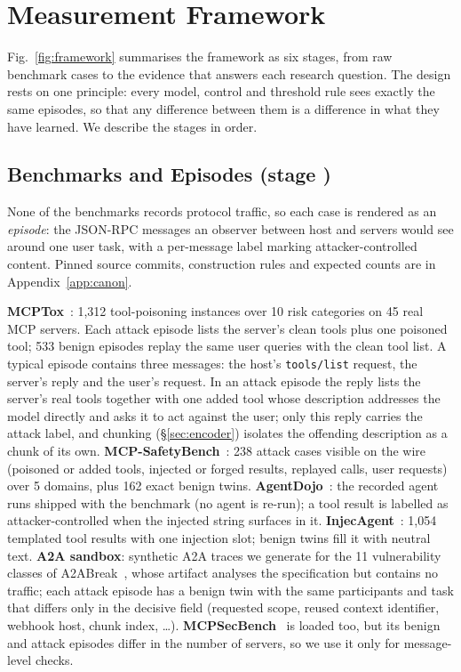 \documentclass[conference,compsoc]{IEEEtran}
\begin{document}
\section{Measurement Framework}
\label{sec:method}
Fig.~\ref{fig:framework} summarises the framework as six stages, from raw benchmark cases to the evidence that answers each research question. The design rests on one principle: every model, control and threshold rule sees exactly the same episodes, so that any difference between them is a difference in what they have learned. We describe the stages in order.

\subsection{Benchmarks and Episodes (stage )}
\label{sec:benchmarks}
None of the benchmarks records protocol traffic, so each case is rendered as an \emph{episode}: the JSON-RPC messages an observer between host and servers would see around one user task, with a per-message label marking attacker-controlled content. Pinned source commits, construction rules and expected counts are in Appendix~\ref{app:canon}.

\textbf{MCPTox}~\cite{Wang2025MCPTox}: 1,312 tool-poisoning instances over 10 risk categories on 45 real MCP servers. Each attack episode lists the server's clean tools plus one poisoned tool; 533 benign episodes replay the same user queries with the clean tool list. A typical episode contains three messages: the host's \texttt{tools/list} request, the server's reply and the user's request. In an attack episode the reply lists the server's real tools together with one added tool whose description addresses the model directly and asks it to act against the user; only this reply carries the attack label, and chunking (\S\ref{sec:encoder}) isolates the offending description as a chunk of its own. \textbf{MCP-SafetyBench}~\cite{Zong2026SafetyBench}: 238 attack cases visible on the wire (poisoned or added tools, injected or forged results, replayed calls, user requests) over 5 domains, plus 162 exact benign twins. \textbf{AgentDojo}~\cite{Debenedetti2024AgentDojo}: the recorded agent runs shipped with the benchmark (no agent is re-run); a tool result is labelled as attacker-controlled when the injected string surfaces in it. \textbf{InjecAgent}~\cite{Zhan2024InjecAgent}: 1,054 templated tool results with one injection slot; benign twins fill it with neutral text. \textbf{A2A sandbox}: synthetic A2A traces we generate for the 11 vulnerability classes of A2ABreak~\cite{Lotfi2026A2ABreak}, whose artifact analyses the specification but contains no traffic; each attack episode has a benign twin with the same participants and task that differs only in the decisive field (requested scope, reused context identifier, webhook host, chunk index, \ldots). \textbf{MCPSecBench}~\cite{Yang2025MCPSec} is loaded too, but its benign and attack episodes differ in the number of servers, so we use it only for message-level checks.
\end{document}
